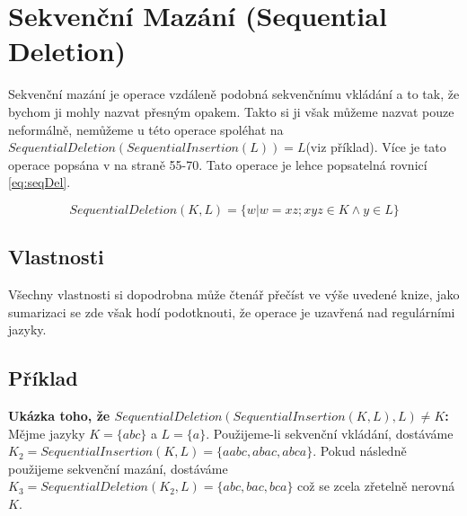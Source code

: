 \section{Sekvenční Mazání (Sequential Deletion)}
Sekvenční mazání je operace vzdáleně podobná sekvenčnímu vkládání a to tak, že bychom ji mohly nazvat přesným opakem. Takto si ji však můžeme nazvat pouze neformálně, nemůžeme u této operace spoléhat na $SequentialDeletion(SequentialInsertion(L))=L$(viz příklad).
Více je tato operace popsána v \cite{lilaKari} na straně 55-70. Tato operace je lehce popsatelná rovnicí \ref{eq:seqDel}.

\begin{equation}\label{eq:seqDel}
	SequentialDeletion(K,L) = \{w|w=xz; xyz \in K \land y \in L\} 
\end{equation}

\subsection{Vlastnosti}
Všechny vlastnosti si dopodrobna může čtenář přečíst ve výše uvedené knize, jako sumarizaci se zde však hodí podotknouti, že operace je uzavřená nad regulárními jazyky.  

\subsection{Příklad}
\textbf{Ukázka toho, že $SequentialDeletion(SequentialInsertion(K,L),L)\neq K$:}\\
Mějme jazyky $K=\{abc\}$ a $L=\{a\}$. Použijeme-li sekvenční vkládání, dostáváme $K_{2} = SequentialInsertion(K,L)=\{aabc,abac,abca\}$. Pokud následně použijeme sekvenční mazání, dostáváme $K_{3}=SequentialDeletion(K_{2},L) = \{abc,bac,bca\}$ což se zcela zřetelně nerovná $K$.
